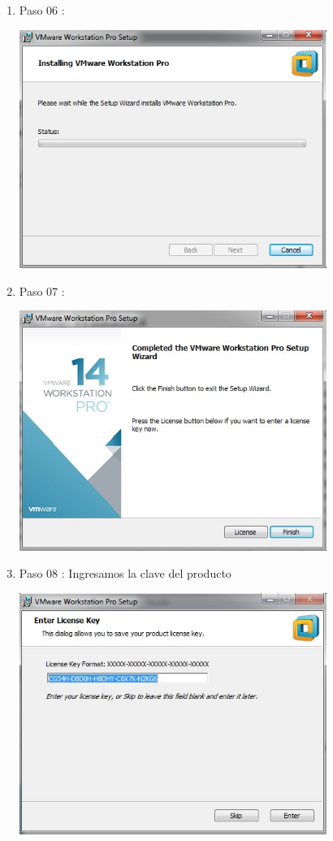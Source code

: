 \begin{enumerate}[1.]
	\item Paso 06 :

	\begin{center}
	\includegraphics[width=10cm]{./Imagenes/WM06} 
	\end{center}

	\hfill \break
	\hfill \break
	\hfill \break
	\hfill \break
	\hfill \break
	\hfill \break
	\hfill \break
	\hfill \break
	\item Paso 07 :

	\begin{center}
	\includegraphics[width=10cm]{./Imagenes/WM07} 
	\end{center}

	\item Paso 08 : Ingresamos la clave del producto

	\begin{center}
	\includegraphics[width=10cm]{./Imagenes/WM08} 
	\end{center}

	\hfill \break
	\hfill \break
	\hfill \break
	\hfill \break
	\hfill \break
	\hfill \break
	\hfill \break
	\hfill \break

\end{enumerate} 
